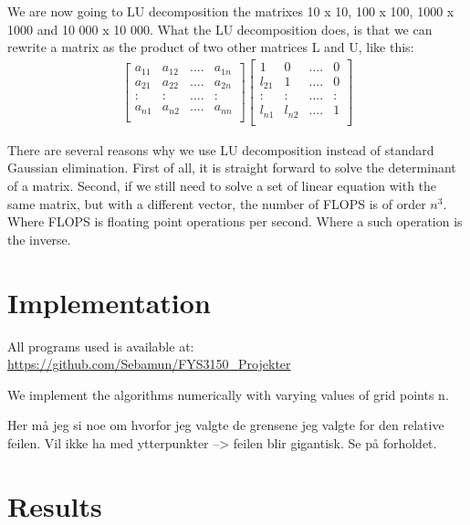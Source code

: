 \documentclass[norsk,a4paper,12pt]{article}
\begin{document}
We are now going to LU decomposition the matrixes 10 x 10, 100 x 100, 1000 x 1000 and 10 000 x 10 000. What the LU decomposition does, is that we can rewrite a matrix as the product of two other matrices L and U, like this:
\begin{align*}
\begin{bmatrix}
a_{11} & a_{12} & .... & a_{1n} \\
a_{21} & a_{22} & .... & a_{2n} \\
: & :& .... & : \\
a_{n1} & a_{n2} & .... & a_{nn} \\
\end{bmatrix}
\begin{bmatrix}
1 & 0 & .... & 0 \\
l_{21} & 1 & .... & 0 \\
: & :& .... & : \\
l_{n1} & l_{n2} & .... & 1\\
\end{bmatrix}
\end{align*}





There are several reasons why we use LU decomposition instead of standard Gaussian elimination. First of all, it is straight forward to solve the determinant of a matrix. Second, if we still need to solve a set of linear equation with the same matrix, but with a different vector, the number of FLOPS is of order $n^3$. Where FLOPS is floating point operations per second. Where a such operation is the inverse. 




\section{Implementation}

All programs used is available at: \\
\url{https://github.com/Sebamun/FYS3150_Projekter}

We implement the algorithms numerically with varying values of grid points n.

Her må jeg si noe om hvorfor jeg valgte de grensene jeg valgte for den relative feilen. Vil ikke ha med ytterpunkter --> feilen blir gigantisk. Se på forholdet. 

\section{Results}
\end{document}

